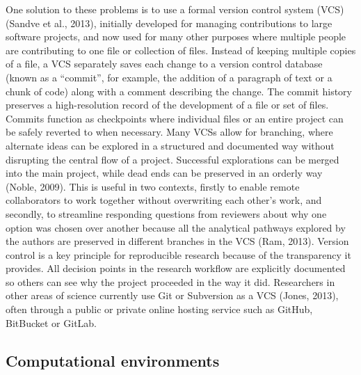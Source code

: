 \documentclass[american,man]{apa6}
\newcounter{author}
\begin{document}
One solution to these problems is to use a formal version control system
(VCS) (Sandve et al., 2013), initially developed for managing
contributions to large software projects, and now used for many other
purposes where multiple people are contributing to one file or
collection of files. Instead of keeping multiple copies of a file, a VCS
separately saves each change to a version control database (known as a
\enquote{commit}, for example, the addition of a paragraph of text or a
chunk of code) along with a comment describing the change. The commit
history preserves a high-resolution record of the development of a file
or set of files. Commits function as checkpoints where individual files
or an entire project can be safely reverted to when necessary. Many VCSs
allow for branching, where alternate ideas can be explored in a
structured and documented way without disrupting the central flow of a
project. Successful explorations can be merged into the main project,
while dead ends can be preserved in an orderly way (Noble, 2009). This
is useful in two contexts, firstly to enable remote collaborators to
work together without overwriting each other's work, and secondly, to
streamline responding questions from reviewers about why one option was
chosen over another because all the analytical pathways explored by the
authors are preserved in different branches in the VCS (Ram, 2013).
Version control is a key principle for reproducible research because of
the transparency it provides. All decision points in the research
workflow are explicitly documented so others can see why the project
proceeded in the way it did. Researchers in other areas of science
currently use Git or Subversion as a VCS (Jones, 2013), often through a
public or private online hosting service such as GitHub, BitBucket or
GitLab.

\subsection{Computational
environments}\label{computational-environments}
\end{document}
